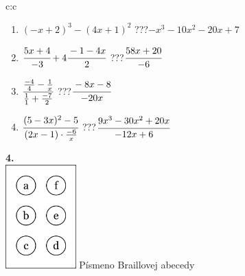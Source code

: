 \documentclass[10pt]{report}
\begin{document}
\begin{tabular}{c:c}
\begin{minipage}[c][104.5mm][t]{0.5\linewidth}
\begin{center}
\begin{minipage}{0.79\linewidth}
\begin{center}
\begin{varwidth}{\linewidth}
\begin{enumerate}
\item $(-x+2)^3-(4x+1)^2$\quad \dotfill\; ???\;\dotfill \quad $-x^3-10x^2-20x+7$
\item $\cfrac{5x+4}{-3}+4\cfrac{-1-4x}{2}$\quad \dotfill\; ???\;\dotfill \quad $\cfrac{58x+20}{-6}$
\item $\cfrac{\frac{-4}{4}-\frac{1}{x}}{\frac{1}{1}+\frac{-7}{2}}$\quad \dotfill\; ???\;\dotfill \quad $\cfrac{-8x-8}{-20x}$
\item $\cfrac{(5-3x)^2-5}{(2x-1)\cdot\frac{-6}{x}}$\quad \dotfill\; ???\;\dotfill \quad $\cfrac{9x^3-30x^2+20x}{-12x+6}$
\end{enumerate}
\end{varwidth}
\end{center}
\end{minipage}
\begin{minipage}{0.20\linewidth}
\begin{center}
{\Huge\bfseries 4.} \\[2mm]
\includegraphics[height=40mm]{../images/braille.png}
{\small Písmeno Braillovej abecedy}
\end{center}
\end{minipage}
\end{center}
\end{minipage}
%
\end{tabular}
\newpage
\thispagestyle{empty}
\end{document}
